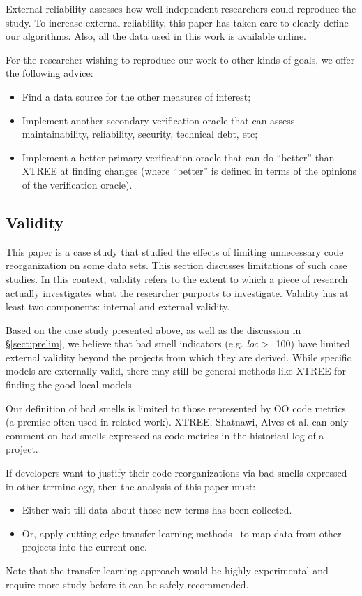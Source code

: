 \documentclass[twocolumn,5p]{elsarticle}
\newcommand{\bi}{\begin{itemize}[leftmargin=0.4cm]}
\newcommand{\ei}{\end{itemize}}
\newcommand{\tion}[1]{\S\ref{sect:#1}}
\theoremstyle{break}
\begin{document}
	External reliability assesses how well independent researchers
	could reproduce the study. To increase external
	reliability, this paper has taken care to clearly define our
	algorithms. Also, all the data used in this work is available
	online.
	
	For the researcher wishing to reproduce our work to other kinds of goals, 
	we offer the following advice:
	
	\bi
	\item Find a data source for the other measures of interest;
	\item Implement another secondary verification oracle that can assess 
	maintainability, reliability, security, technical debt, etc;
	\item Implement a better primary verification oracle that can do ``better'' 
	than XTREE at finding changes (where ``better'' is defined in terms
	of the opinions of the verification oracle). 
	\ei
	
	
	\subsection{Validity}
	
	This paper is a case study that studied the effects of  limiting 
	unnecessary code reorganization on some data sets. This section discusses 
	limitations of such case studies. In this context, validity refers to the 
	extent to which a piece of research actually
	investigates what the researcher purports to investigate.
	Validity has at least two components: internal and
	external validity.
	

	Based on the case study presented above,
	as well as the discussion in \tion{prelim},
	we believe that bad smell indicators (e.g. \mbox{{\em loc}$>$ 100})
	have limited external validity beyond the projects from which they are 
	derived.
	While specific models are externally valid,
	there may still be general methods like XTREE for finding the good local 
	models.
	
	Our definition of bad smells is limited to those represented by OO code 
	metrics (a premise often used in related work).
	XTREE, Shatnawi, Alves et al. can  only comment
	on bad smells   expressed as code metrics
	in the historical log of a project.
	
	If developers want to justify their code reorganizations
	via bad smells expressed in other terminology,
	then the  analysis of this paper must:
	\begin{itemize}
		\item Either wait till
		data about those new
		terms has been collected.
		\item Or, apply cutting edge transfer learning
		methods~\cite{Nam15,Jing15, krishna16} to map data from other projects
		into the current one.
	\end{itemize}
	Note that the transfer learning approach would
	be highly experimental and require more study
	before it can be safely recommended.
		
\end{document}
